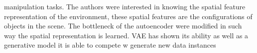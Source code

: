 manipulation tasks. The authors were interested in knowing the spatial feature representation of the environment, these spatial features are the configurations of objects in the scene. The bottleneck of the autoencoder were modified in such way the spatial representation is learned. VAE has shown its ability as well as a generative model it is able to compete w generate new data instances 

\clearpage{\pagestyle{empty}\cleardoublepage}
